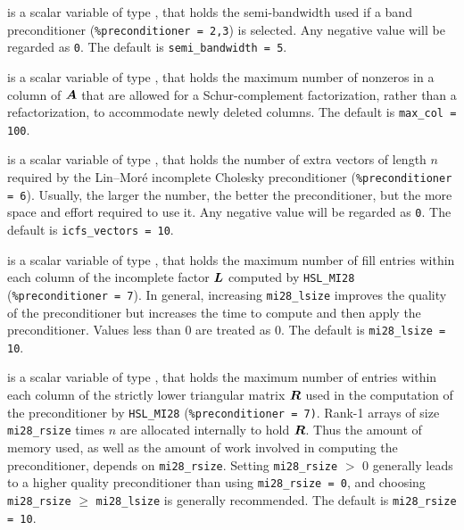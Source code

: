 \documentclass{galahad}
\begin{document}
\begin{description}
 is a scalar variable of type \integer, that holds
the semi-bandwidth used if a band preconditioner ({\tt \%preconditioner = 2,3})
is selected. Any negative value will be regarded as {\tt 0}.
The default is {\tt semi\_bandwidth = 5}.



 is a scalar variable of type \integer, that holds
the maximum number of nonzeros in a column of ${\bm{A}}$ that are allowed
for a Schur-complement factorization, rather than a refactorization, 
to accommodate newly deleted columns.
The default is {\tt max\_col = 100}.

 is a scalar variable of type \integer, that holds
the number of extra vectors of length $n$ required by the Lin--Mor\'{e} 
incomplete Cholesky preconditioner ({\tt \%preconditioner = 6}).
Usually, the larger the number, the
better the preconditioner, but the more space and effort required to
use it. Any negative value will be regarded as {\tt 0}.
The default is {\tt icfs\_vectors = 10}.

 is a scalar variable of type \integer, that holds
the maximum number of fill entries within each column of the incomplete
factor ${\bm{L}}$ computed by {\tt HSL\_MI28} ({\tt \%preconditioner = 7}).
In general, increasing {\tt mi28\_lsize} improves
the quality of the preconditioner but increases the time to compute
and then apply the preconditioner. Values less than 0 are treated as 0.
The default is {\tt mi28\_lsize = 10}.

 is a scalar variable of type \integer, that holds
the maximum number of entries within each column of the strictly lower
triangular matrix ${\bm{R}}$ used in the computation of the preconditioner by
{\tt HSL\_MI28} ({\tt \%preconditioner = 7)}.
Rank-1 arrays of size {\tt mi28\_rsize} times $n$ are allocated internally
to hold ${\bm{R}}$. Thus the amount of memory used, as well as the amount of work
involved in computing the preconditioner, depends on {\tt mi28\_rsize}. 
Setting {\tt mi28\_rsize} $>$ 0 generally leads to a higher quality 
preconditioner than using {\tt mi28\_rsize = 0}, and choosing 
{\tt mi28\_rsize} $\geq$  {\tt mi28\_lsize} is generally recommended.
The default is {\tt mi28\_rsize = 10}.


\end{description}
\end{document}
